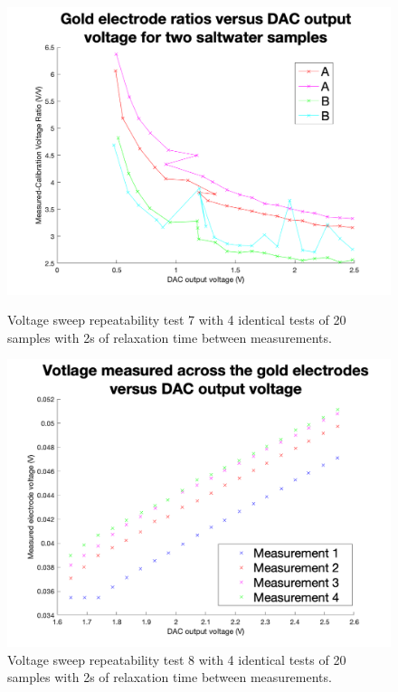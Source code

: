\begin{figure}[ht]
    \begin{minipage}{0.5\textwidth}
        \centering
        \includegraphics[width=\textwidth]{Figures/Testing/Aus12}
        \caption{Voltage sweep repeatability test 7 with 4 identical tests of 20 samples with 2s of relaxation time between measurements.}
        \label{fig:test7} %
    \end{minipage}
    \begin{minipage}{0.5\textwidth}
        \centering
        \includegraphics[width=\textwidth]{Figures/Testing/Aus10}
        \caption{Voltage sweep repeatability test 8 with 4 identical tests of 20 samples with 2s of relaxation time between measurements.}
        \label{fig:test8} %
    \end{minipage}
\end{figure}

